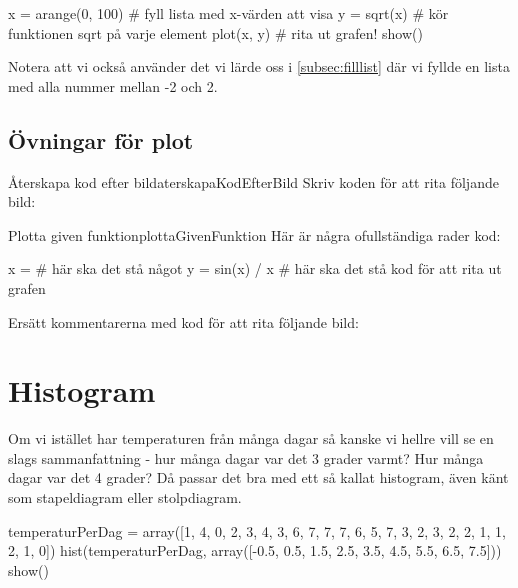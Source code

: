 \begin{python}[caption={Plotta kvadratrotsfunktion},label={}]
x = arange(0, 100) # fyll lista med x-värden att visa
y = sqrt(x) # kör funktionen sqrt på varje element
plot(x, y) # rita ut grafen!
show()
\end{python}

Notera att vi också använder det vi lärde oss i \autoref{subsec:filllist} där vi fyllde en lista med alla nummer mellan -2 och 2.
\newpage
\subsection{Övningar för plot}

\begin{matteovning}{Återskapa kod efter bild}{aterskapaKodEfterBild}
Skriv koden för att rita följande bild:

\end{matteovning}

\begin{matteovning}{Plotta given funktion}{plottaGivenFunktion}
Här är några ofullständiga rader kod:
\vspace{10pt}
\begin{python}
x = # här ska det stå något
y = sin(x) / x
# här ska det stå kod för att rita ut grafen
\end{python}
Ersätt kommentarerna med kod för att rita följande bild:

\end{matteovning}


\section{Histogram}\label{sec:histogram}

Om vi istället har temperaturen från många dagar så kanske vi hellre vill se en slags sammanfattning - hur många dagar var det 3 grader varmt? Hur många dagar var det 4 grader? Då passar det bra med ett så kallat histogram, även känt som stapeldiagram eller stolpdiagram.

\begin{python}[caption={Vårt första histogram},label={}]
temperaturPerDag = array([1, 4, 0, 2, 3, 4, 3, 6, 7, 7, 7, 6, 5, 7, 3, 2, 3, 2, 2, 1, 1, 2, 1, 0])
hist(temperaturPerDag, array([-0.5, 0.5, 1.5, 2.5, 3.5, 4.5, 5.5, 6.5, 7.5]))
show()
\end{python}

